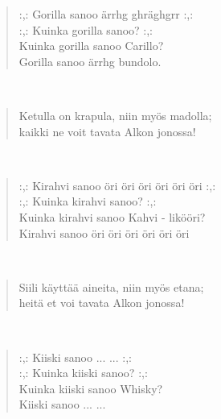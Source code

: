 \noindent\begin{minipage}{\linewidth}
\begin{verse}
	\hspace{0pt-\widthof{:,: }}:,: Gorilla sanoo ärrhg ghräghgrr :,:\\
	\hspace{0pt-\widthof{:,: }}:,: Kuinka gorilla sanoo? :,:\\
	Kuinka gorilla sanoo Carillo?\\
	Gorilla sanoo ärrhg bundolo.\\
\end{verse}
\end{minipage}\\[10pt]
\noindent\begin{minipage}{\linewidth}
\begin{verse}
	Ketulla on krapula, niin myös madolla;\\
	kaikki ne voit tavata Alkon jonossa!\\
\end{verse}
\end{minipage}\\[10pt]
\noindent\begin{minipage}{\linewidth}
\begin{verse}
	\hspace{0pt-\widthof{:,: }}:,: Kirahvi sanoo öri öri öri öri öri öri :,:\\
	\hspace{0pt-\widthof{:,: }}:,: Kuinka kirahvi sanoo? :,:\\
	Kuinka kirahvi sanoo Kahvi - likööri?\\
	Kirahvi sanoo öri öri öri öri öri öri\\
\end{verse}
\end{minipage}\\[10pt]
\noindent\begin{minipage}{\linewidth}
\begin{verse}
	Siili käyttää aineita, niin myös etana;\\
	heitä et voi tavata Alkon jonossa!\\
\end{verse}
\end{minipage}\\[10pt]
\noindent\begin{minipage}{\linewidth}
\begin{verse}
	\hspace{0pt-\widthof{:,: }}:,: Kiiski sanoo ... ... :,:\\
	\hspace{0pt-\widthof{:,: }}:,: Kuinka kiiski sanoo? :,:\\
	Kuinka kiiski sanoo Whisky?\\
	Kiiski sanoo ... ...\\
\end{verse}
\end{minipage}\\[10pt]
